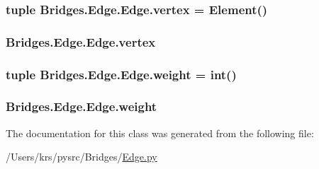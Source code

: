 \subsubsection[{vertex}]{\setlength{\rightskip}{0pt plus 5cm}tuple Bridges.\+Edge.\+Edge.\+vertex = {\bf Element}()\hspace{0.3cm}{\ttfamily [static]}}\label{class_bridges_1_1_edge_1_1_edge_afecb49b1d5bd539ceb200ca41e072069}
\hypertarget{class_bridges_1_1_edge_1_1_edge_aa503f86b141009ca9125093b4e903e38}{}
\subsubsection[{vertex}]{\setlength{\rightskip}{0pt plus 5cm}Bridges.\+Edge.\+Edge.\+vertex}\label{class_bridges_1_1_edge_1_1_edge_aa503f86b141009ca9125093b4e903e38}
\hypertarget{class_bridges_1_1_edge_1_1_edge_a693e3e49a05b4e6c6cce8f88d9c63fd4}{}
\subsubsection[{weight}]{\setlength{\rightskip}{0pt plus 5cm}tuple Bridges.\+Edge.\+Edge.\+weight = int()\hspace{0.3cm}{\ttfamily [static]}}\label{class_bridges_1_1_edge_1_1_edge_a693e3e49a05b4e6c6cce8f88d9c63fd4}
\hypertarget{class_bridges_1_1_edge_1_1_edge_a7219034dae365e8898fbf4bd901285b4}{}
\subsubsection[{weight}]{\setlength{\rightskip}{0pt plus 5cm}Bridges.\+Edge.\+Edge.\+weight}\label{class_bridges_1_1_edge_1_1_edge_a7219034dae365e8898fbf4bd901285b4}


The documentation for this class was generated from the following file\+:\begin{DoxyCompactItemize}
\item 
/\+Users/krs/pysrc/\+Bridges/\hyperlink{_edge_8py}{Edge.\+py}\end{DoxyCompactItemize}
